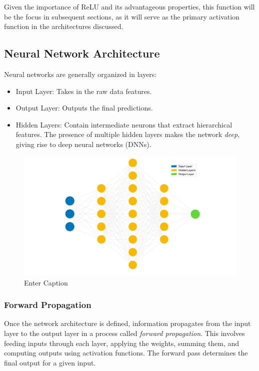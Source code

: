Given the importance of ReLU and its advantageous properties, this function will be the focus in subsequent sections, as it will serve as the primary activation function in the architectures discussed.

\subsection{Neural Network Architecture}
Neural networks are generally organized in layers:
\begin{itemize}
    \item Input Layer: Takes in the raw data features.
    \item Output Layer: Outputs the final predictions.
    \item Hidden Layers: Contain intermediate neurons that extract hierarchical features. The presence of multiple hidden layers makes the network \textit{deep}, giving rise to deep neural networks (DNNs).
\end{itemize}

\begin{figure}
    \centering
    \includegraphics[width=0.75\linewidth]{LateX//figs/nn_intro_def.pdf}
    \caption{Enter Caption}
    \label{fig:enter-label}
\end{figure}

\subsubsection*{Forward Propagation}
Once the network architecture is defined, information propagates from the input layer to the output layer in a process called \textit{forward propagation}. This involves feeding inputs through each layer, applying the weights, summing them, and computing outputs using activation functions. The forward pass determines the final output for a given input.

